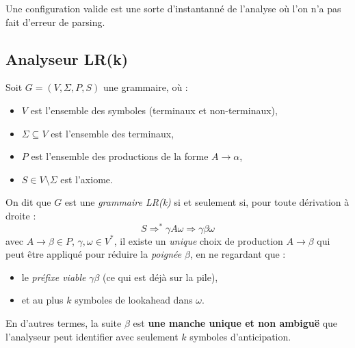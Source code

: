 Une configuration valide est une sorte d'instantanné de l'analyse où l'on n'a pas fait d'erreur de parsing. 

\subsection{Analyseur LR(k)}

\begin{definition}[Grammaire $LR(k)$]
    Soit \(G = (V, \Sigma, P, S)\) une grammaire, où :
    \begin{itemize}
        \item \(V\) est l'ensemble des symboles (terminaux et non-terminaux),
        \item \(\Sigma \subseteq V\) est l'ensemble des terminaux,
        \item \(P\) est l'ensemble des productions de la forme \(A \to \alpha\),
        \item \(S \in V \setminus \Sigma\) est l'axiome.
    \end{itemize}

    On dit que \(G\) est une \emph{grammaire LR(k)} si et seulement si,
    pour toute dérivation à droite :
    \[
    S \Rightarrow^{*} \gamma A \omega \Rightarrow \gamma \beta \omega
    \]
    avec \(A \to \beta \in P\), \(\gamma,\omega \in V^{*}\),
    il existe un \emph{unique} choix de production \(A \to \beta\) qui peut être appliqué
    pour réduire la \emph{poignée} \(\beta\),
    en ne regardant que :
    \begin{itemize}
        \item le \emph{préfixe viable} \(\gamma \beta\) (ce qui est déjà sur la pile),
        \item et au plus \(k\) symboles de lookahead dans \(\omega\).
    \end{itemize}

    En d'autres termes, la suite \(\beta\) est \textbf{une manche unique et non ambiguë}
    que l'analyseur peut identifier avec seulement \(k\) symboles d'anticipation.
\end{definition}


